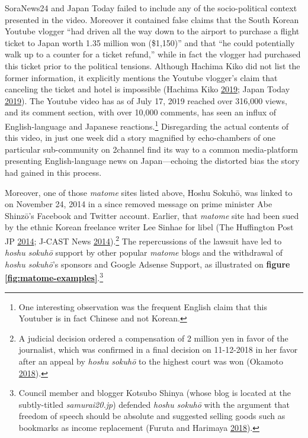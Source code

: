 \documentclass[10pt,british,A4paper,,openany]{memoir}
\begin{document}
SoraNews24 and Japan Today failed to include any of the socio-political
context presented in the video. Moreover it contained false claims that
the South Korean Youtube vlogger ``had driven all the way down to the
airport to purchase a flight ticket to Japan worth 1.35 million won
(\$1,150)'' and that ``he could potentially walk up to a counter for a
ticket refund,'' while in fact the vlogger had purchased this ticket
prior to the political tensions. Although Hachima Kiko did not list the
former information, it explicitly mentions the Youtube vlogger's claim
that canceling the ticket and hotel is impossible (Hachima Kiko
\protect\hyperlink{ref-hachima_kiko_eng:_2019}{2019}; Japan Today
\protect\hyperlink{ref-japan_today_popular_2019}{2019}). The Youtube
video has as of July 17, 2019 reached over 316,000 views, and its
comment section, with over 10,000 comments, has seen an influx of
English-language and Japanese reactions.\footnote{One interesting
  observation was the frequent English claim that this Youtuber is in
  fact Chinese and not Korean.} Disregarding the actual contents of this
video, in just one week did a story magnified by echo-chambers of one
particular sub-community on 2channel find its way to a common
media-platform presenting English-language news on Japan---echoing the
distorted bias the story had gained in this process.

Moreover, one of those \emph{matome} sites listed above, Hoshu Sokuhō,
was linked to on November 24, 2014 in a since removed message on prime
minister Abe Shinzō's Facebook and Twitter account. Earlier, that
\emph{matome} site had been sued by the ethnic Korean freelance writer
Lee Sinhae for libel (The Huffington Post JP
\protect\hyperlink{ref-the_huffington_post_jp_lee_2014}{2014}; J-CAST
News \protect\hyperlink{ref-j-cast_news_eng:_2014}{2014}).\footnote{A
  judicial decision ordered a compensation of 2 million yen in favor of
  the journalist, which was confirmed in a final decision on 11-12-2018
  in her favor after an appeal by \emph{hoshu sokuhō} to the highest
  court was won (Okamoto
  \protect\hyperlink{ref-okamoto_eng:_2018}{2018}).} The repercussions
of the lawsuit have led to \emph{hoshu sokuhō} support by other popular
\emph{matome} blogs and the withdrawal of \emph{hoshu sokuhō}'s sponsors
and Google Adsense Support, as illustrated on \textbf{figure
\ref{fig:matome-examples}}.\footnote{Council member and blogger Kotsubo
  Shinya (whose blog is located at the subtly-titled
  \emph{samurai20.jp}) defended \emph{hoshu sokuhō} with the argument
  that freedom of speech should be absolute and suggested selling goods
  such as bookmarks as income replacement (Furuta and Harimaya
  \protect\hyperlink{ref-furuta_eng:_2018}{2018}).}
\end{document}

